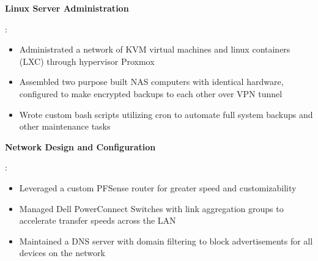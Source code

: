 \documentclass[letterpaper,11pt]{article}
\newcommand{\resumeItem}[2]{
  \item\small{
    \textbf{#1}{: #2 \vspace{-2pt}}
  }
}
\begin{document}
  \resumeItem{Linux Server Administration}
  {
    \begin{itemize}
      \item Administrated a network of KVM virtual machines and linux containers (LXC) through hypervisor Proxmox
      \item Assembled two purpose built NAS computers with identical hardware, configured to make encrypted backups to each other over VPN tunnel
      \item Wrote custom bash scripts utilizing cron to automate full system backups and other maintenance tasks
  \end{itemize}
}
  \resumeItem{Network Design and Configuration}
  { 
  \begin{itemize}
      \item Leveraged a custom PFSense router for greater speed and customizability
      \item Managed Dell PowerConnect Switches with link aggregation groups to accelerate transfer speeds across the LAN
      \item Maintained a DNS server with domain filtering to block advertisements for all devices on the network
  \end{itemize}
  }
\end{document}
